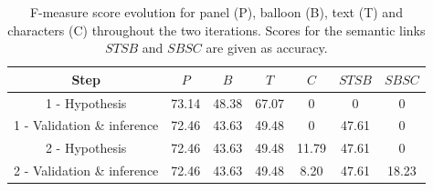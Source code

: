   \begin{table}[ht]
    \normalsize

    \centering
    \caption{F-measure score evolution for panel (P), balloon (B), text (T) and characters (C) throughout the two iterations. Scores for the semantic links $STSB$ and $SBSC$ are given as accuracy.}
    \setlength{\tabcolsep}{.45em}
    \begin{tabular}{|c|c|c|c|c|c|c|}

          \hline
        Step & $P$ & $B$ & $T$ & $C$ & $STSB$ & $SBSC$    \\
        \hline
        
        1 - Hypothesis              & 73.14   & 48.38  & 67.07 & 0  & 0 & 0  \\
        \hline
        1 - Validation \& inference  & 72.46   & 43.63  & 49.48 & 0  & 47.61 & 0  \\
        \hline
        2 - Hypothesis              & 72.46   & 43.63  & 49.48 & 11.79  & 47.61 & 0  \\
        \hline
        2 - Validation \& inference  & 72.46   & 43.63  & 49.48 & 8.20  & 47.61 & 18.23  \\
        \hline
        \end{tabular}
    \label{tab:ex:framework_evaluation_details}
  \end{table}%



